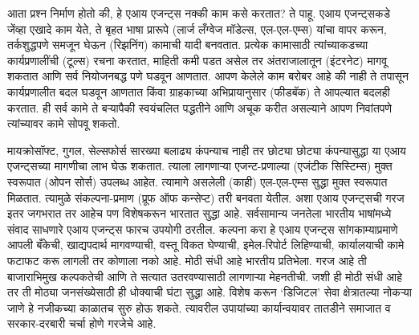 आता प्रश्न निर्माण होतो की, हे एआय एजन्ट्स नक्की काम कसे करतात? ते पाहू. एआय एजन्ट्सकडे जेंव्हा एखादे काम येते, ते बृहत भाषा प्रारूपे (लार्ज लँग्वेज मॉडेल्स, एल-एल-एम्स) यांचा वापर करून, तर्कशुद्धपणे समजून घेऊन (रिझनिंग) कामाची यादी बनवतात. प्रत्येक कामासाठी त्यांच्याकडच्या कार्यप्रणालींची (टूल्स) रचना करतात, माहिती कमी पडत असेल तर अंतराजालातून (इंटरनेट) मागवू शकतात आणि सर्व नियोजनबद्ध पणे घडवून आणतात. आपण केलेले काम बरोबर आहे की नाही ते तपासून कार्यप्रणालीत बदल घडवून आणतात किंवा ग्राहकाच्या अभिप्रायानुसार (फीडबॅक) ते आपल्यात बदलही करतात. ही सर्व कामे ते बऱ्यापैकी स्वयंचलित पद्धतीने आणि अचूक करीत असल्याने आपण निवांतपणे त्यांच्यावर कामे सोपवू शकतो. 

मायक्रोसॉफ्ट, गुगल, सेल्सफोर्स सारख्या बलाढ्य कंपन्याच नाही तर छोट्या छोट्या कंपन्यासुद्धा या एआय एजन्ट्सच्या मागणीचा लाभ घेऊ शकतात. त्याला लागणाऱ्या एजन्ट-प्रणाल्या (एजंटीक सिस्टिम्स) मुक्त स्वरूपात (ओपन सोर्स) उपलब्ध आहेत. त्यामागे असलेली (काही)  एल-एल-एम्स सुद्धा मुक्त स्वरूपात मिळतात. त्यामुळे संकल्पना-प्रमाण (प्रूफ ऑफ कन्सेप्ट) तरी बनवता येतील. अशा एआय एजन्ट्सची गरज इतर जगभरात तर आहेच पण विशेषकरून भारतात सुद्धा आहे. सर्वसामान्य जनतेला भारतीय भाषांमध्ये संवाद साधणारे एआय एजन्ट्स  फारच उपयोगी ठरतील. कल्पना करा हे एआय एजन्ट्स सांगकाम्याप्रमाणे आपली बँकेची, खाद्यपदार्थ मागवण्याची, वस्तू विकत घेण्याची, इमेल-रिपोर्ट लिहिण्याची, कार्यालयाची कामे फटाफट करू लागली तर कोणाला नको आहे. मोठी संधी आहे भारतीय प्रतिभेला. गरज आहे ती बाजाराभिमुख कल्पकतेची आणि ते सत्यात उतरवण्यासाठी लागणाऱ्या मेहनतीची. जशी ही मोठी संधी आहे तर ती मोठ्या जनसंख्येसाठी ही धोक्याची घंटा सुद्धा आहे. विशेष करून ‘डिजिटल’ सेवा क्षेत्रातल्या नोकऱ्या जाणे हे नजीकच्या काळातच सुरु होऊ शकते.  त्यावरील उपायांच्या कार्यान्वयावर तातडीने समाजात व सरकार-दरबारी चर्चा होणे गरजेचे आहे. 